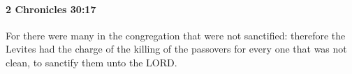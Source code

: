 
		\paragraph{2 Chronicles 30:17} %
			\label{2CHRONICLES-30-17}

			For there were many in the congregation that were not sanctified: therefore the Levites had the charge of the killing of the passovers for every one that was not clean, to sanctify them unto the LORD.


